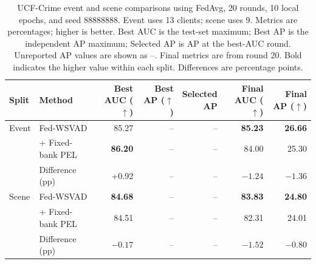 \begin{table}[t]
  \centering
  \caption{UCF-Crime event and scene comparisons using FedAvg, 20 rounds, 10 local epochs, and seed 88888888. Event uses 13 clients; scene uses 9. Metrics are percentages; higher is better. Best AUC is the test-set maximum; Best AP is the independent AP maximum; Selected AP is AP at the best-AUC round. Unreported AP values are shown as --. Final metrics are from round 20. Bold indicates the higher value within each split. Differences are percentage points.}
  \label{tab:ucf-event-scene-fixed-bank-pel}
  \small
  \setlength{\tabcolsep}{4pt}
  \begin{tabular}{llrrrrr}
    \toprule
    Split & Method & \shortstack{Best AUC\\($\uparrow$)} & \shortstack{Best AP\\($\uparrow$)} & \shortstack{Selected\\AP} & \shortstack{Final AUC\\($\uparrow$)} & \shortstack{Final AP\\($\uparrow$)} \\
    \midrule
    Event & Fed-WSVAD & 85.27 & -- & -- & \textbf{85.23} & \textbf{26.66} \\
          & + Fixed-bank PEL & \textbf{86.20} & -- & -- & 84.00 & 25.30 \\
          & Difference (pp) & +0.92 & -- & -- & $-1.24$ & $-1.36$ \\
    \midrule
    Scene & Fed-WSVAD & \textbf{84.68} & -- & -- & \textbf{83.83} & \textbf{24.80} \\
          & + Fixed-bank PEL & 84.51 & -- & -- & 82.31 & 24.01 \\
          & Difference (pp) & $-0.17$ & -- & -- & $-1.52$ & $-0.80$ \\
    \bottomrule
  \end{tabular}
\end{table}
